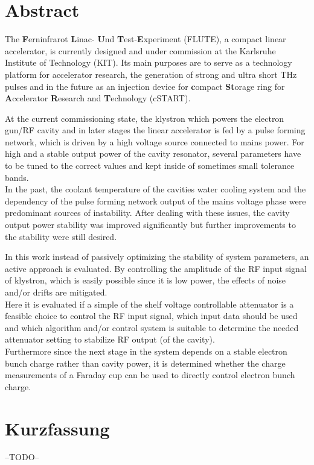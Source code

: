 \section*{Abstract}
The \textbf{F}erninfrarot \textbf{L}inac- \textbf{U}nd \textbf{T}est-\textbf{E}xperiment (FLUTE), a compact linear accelerator, is currently designed and under commission at the Karlsruhe Institute of Technology (KIT). Its main purposes are to serve as a technology platform for accelerator research, the generation of strong and ultra short THz pulses and in the future as an injection device for \textbf{c}ompact \textbf{St}orage ring for \textbf{A}ccelerator \textbf{R}esearch and \textbf{T}echnology (cSTART).

At the current commissioning state, the klystron which powers the electron gun/RF cavity and in later stages the linear accelerator is fed by a pulse forming network, which is driven by a high voltage source connected to mains power. For high and a stable output power of the cavity resonator, several parameters have to be tuned to the correct values and kept inside of sometimes small tolerance bands.\\
In the past, the coolant temperature of the cavities water cooling system and the dependency of the pulse forming network output of the mains voltage phase were predominant sources of instability. After dealing with these issues, the cavity output power stability was improved significantly but further improvements to the stability were still desired.

In this work instead of passively optimizing the stability of system parameters, an active approach is evaluated. By controlling the amplitude of the RF input signal of klystron, which is easily possible since it is low power, the effects of noise and/or drifts are mitigated.\\
Here it is evaluated if a simple of the shelf voltage controllable attenuator is a feasible choice to control the RF input signal, which input data should be used and which algorithm and/or control system is suitable to determine the needed attenuator setting to stabilize RF output (of the cavity).\\
Furthermore since the next stage in the system depends on a stable electron bunch charge rather than cavity power, it is determined whether the charge measurements of a Faraday cup can be used to directly control electron bunch charge.

\section*{Kurzfassung}
--TODO--